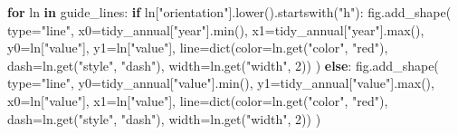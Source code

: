 \documentclass[
  letterpaper,
  DIV=11,
  numbers=noendperiod]{scrreprt}
\newenvironment{Shaded}{\begin{snugshade}}{\end{snugshade}}
\newcommand{\BuiltInTok}[1]{\textcolor[rgb]{0.00,0.23,0.31}{#1}}
\newcommand{\ControlFlowTok}[1]{\textcolor[rgb]{0.00,0.23,0.31}{\textbf{#1}}}
\newcommand{\DecValTok}[1]{\textcolor[rgb]{0.68,0.00,0.00}{#1}}
\newcommand{\KeywordTok}[1]{\textcolor[rgb]{0.00,0.23,0.31}{\textbf{#1}}}
\newcommand{\NormalTok}[1]{\textcolor[rgb]{0.00,0.23,0.31}{#1}}
\newcommand{\OperatorTok}[1]{\textcolor[rgb]{0.37,0.37,0.37}{#1}}
\newcommand{\StringTok}[1]{\textcolor[rgb]{0.13,0.47,0.30}{#1}}
\begin{document}
\begin{Shaded}
\begin{Highlighting}[]
\ControlFlowTok{for}\NormalTok{ ln }\KeywordTok{in}\NormalTok{ guide\_lines:}
    \ControlFlowTok{if}\NormalTok{ ln[}\StringTok{"orientation"}\NormalTok{].lower().startswith(}\StringTok{"h"}\NormalTok{):}
\NormalTok{        fig.add\_shape(}
            \BuiltInTok{type}\OperatorTok{=}\StringTok{"line"}\NormalTok{,}
\NormalTok{            x0}\OperatorTok{=}\NormalTok{tidy\_annual[}\StringTok{"year"}\NormalTok{].}\BuiltInTok{min}\NormalTok{(), x1}\OperatorTok{=}\NormalTok{tidy\_annual[}\StringTok{"year"}\NormalTok{].}\BuiltInTok{max}\NormalTok{(),}
\NormalTok{            y0}\OperatorTok{=}\NormalTok{ln[}\StringTok{"value"}\NormalTok{], y1}\OperatorTok{=}\NormalTok{ln[}\StringTok{"value"}\NormalTok{],}
\NormalTok{            line}\OperatorTok{=}\BuiltInTok{dict}\NormalTok{(color}\OperatorTok{=}\NormalTok{ln.get(}\StringTok{"color"}\NormalTok{, }\StringTok{"red"}\NormalTok{),}
\NormalTok{                      dash}\OperatorTok{=}\NormalTok{ln.get(}\StringTok{"style"}\NormalTok{, }\StringTok{"dash"}\NormalTok{),}
\NormalTok{                      width}\OperatorTok{=}\NormalTok{ln.get(}\StringTok{"width"}\NormalTok{, }\DecValTok{2}\NormalTok{))}
\NormalTok{        )}
    \ControlFlowTok{else}\NormalTok{:}
\NormalTok{        fig.add\_shape(}
            \BuiltInTok{type}\OperatorTok{=}\StringTok{"line"}\NormalTok{,}
\NormalTok{            y0}\OperatorTok{=}\NormalTok{tidy\_annual[}\StringTok{"value"}\NormalTok{].}\BuiltInTok{min}\NormalTok{(), y1}\OperatorTok{=}\NormalTok{tidy\_annual[}\StringTok{"value"}\NormalTok{].}\BuiltInTok{max}\NormalTok{(),}
\NormalTok{            x0}\OperatorTok{=}\NormalTok{ln[}\StringTok{"value"}\NormalTok{], x1}\OperatorTok{=}\NormalTok{ln[}\StringTok{"value"}\NormalTok{],}
\NormalTok{            line}\OperatorTok{=}\BuiltInTok{dict}\NormalTok{(color}\OperatorTok{=}\NormalTok{ln.get(}\StringTok{"color"}\NormalTok{, }\StringTok{"red"}\NormalTok{),}
\NormalTok{                      dash}\OperatorTok{=}\NormalTok{ln.get(}\StringTok{"style"}\NormalTok{, }\StringTok{"dash"}\NormalTok{),}
\NormalTok{                      width}\OperatorTok{=}\NormalTok{ln.get(}\StringTok{"width"}\NormalTok{, }\DecValTok{2}\NormalTok{))}
\NormalTok{        )}


\end{Highlighting}
\end{Shaded}
\end{document}
